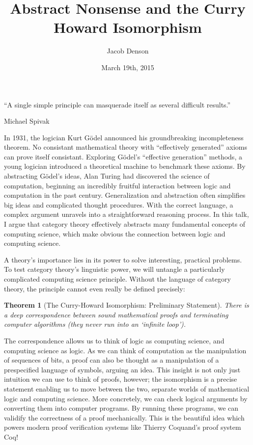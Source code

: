 \documentclass{article}
\title{Abstract Nonsense and the Curry Howard Isomorphism}
\author{Jacob Denson}
\date{March 19th, 2015}
\theoremstyle{plain}
\newtheorem{theorem}{Theorem}
\begin{document}
\maketitle

\epigraph{``A single simple principle can masquerade itself as several difficult results.''}{Michael Spivak}

In 1931, the logician Kurt G\"{o}del announced his groundbreaking incompleteness theorem. No consistant mathematical theory with ``effectively generated'' axioms can prove itself consistant. Exploring G\"{o}del's  ``effective generation'' methods, a young logician introduced a theoretical machine to benchmark these axioms. By abstracting G\"{o}del's ideas, Alan Turing had discovered the science of computation, beginning an incredibly fruitful interaction between logic and computation in the past century. Generalization and abstraction often simplifies big ideas and complicated thought procedures. With the correct language, a complex argument unravels into a straightforward reasoning process. In this talk, I argue that category theory effectively abstracts many fundamental concepts of computing science, which make obvious the connection between logic and computing science.

A theory's importance lies in its power to solve interesting, practical problems. To test category theory's linguistic power, we will untangle a particularly complicated computing science principle. Without the language of category theory, the principle cannot even really be defined precisely:

\begin{theorem}[The Curry-Howard Isomorphism: Preliminary Statement]
    There is a deep correspondence between sound mathematical proofs and terminating computer algorithms (they never run into an `infinite loop').
\end{theorem}

The correspondence allows us to think of logic as computing science, and computing science as logic. As we can think of computation as the manipulation of sequences of bits, a proof can also be thought as a manipulation of a prespecified language of symbols, arguing an idea. This insight is not only just intuition we can use to think of proofs, however; the isomorphism is a precise statement enabling us to move between the two, separate worlds of mathematical logic and computing science. More concretely, we can check logical arguments by converting them into computer programs. By running these programs, we can validify the correctness of a proof mechanically. This is the beautiful idea which powers modern proof verification systems like Thierry Coquand's proof system Coq!
\end{document}
